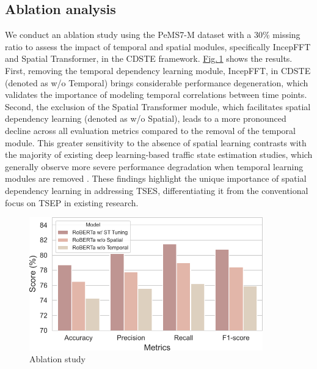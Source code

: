 \documentclass[a4paper,fleqn,12pt]{cas-sc}
\newcommand{\rev}[1]{{\color{red} #1}}
\begin{document}
\rev{\subsection{Ablation analysis}
We conduct an ablation study using the PeMS7-M dataset with a 30\% missing ratio to assess the impact of temporal and spatial modules, specifically IncepFFT and Spatial Transformer, in the CDSTE framework. \hyperref[fig:Ablation]{Fig.\,\ref{fig:Ablation}} shows the results. First, removing the temporal dependency learning module, IncepFFT, in CDSTE (denoted as w/o Temporal) brings considerable performance degeneration, which validates the importance of modeling temporal correlations between time points. Second, the exclusion of the Spatial Transformer module, which facilitates spatial dependency learning (denoted as w/o Spatial), leads to a more pronounced decline across all evaluation metrics compared to the removal of the temporal module. This greater sensitivity to the absence of spatial learning contrasts with the majority of existing deep learning-based traffic state estimation studies, which generally observe more severe performance degradation when temporal learning modules are removed \citep{xu2020real,liang2022memory}. These findings highlight the unique importance of spatial dependency learning in addressing TSES, differentiating it from the conventional focus on TSEP in existing research.
}

\begin{figure}[pos=htbp,width=5cm,align=\centering]
\colorbox{red!5}{
\parbox{\linewidth}{
  \centering 
  \includegraphics[width=0.9\textwidth]{figs/ablation.pdf}
  \caption{Ablation study}\label{fig:Ablation}
  }}
\end{figure}
\end{document}
